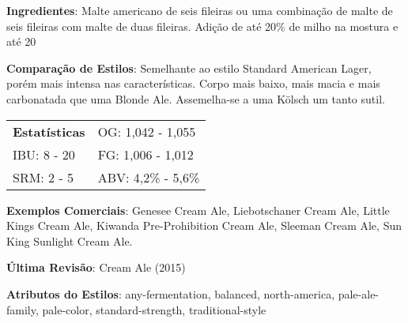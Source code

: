\textbf{Ingredientes}: Malte americano de seis fileiras ou uma combinação de malte de seis fileiras com malte de duas fileiras. Adição de até 20\% de milho na mostura e até 20%

\textbf{Comparação de Estilos}: Semelhante ao estilo Standard American Lager, porém mais intensa nas características. Corpo mais baixo, mais macia e mais carbonatada que uma Blonde Ale. Assemelha-se a uma Kölsch um tanto sutil.

\begin{tabular}{@{}p{35mm}p{35mm}@{}}
  \textbf{Estatísticas} & OG: 1,042 - 1,055 \\
  IBU: 8 - 20  & FG: 1,006 - 1,012 \\
  SRM: 2 - 5  & ABV: 4,2\% - 5,6\%
\end{tabular}

\textbf{Exemplos Comerciais}: Genesee Cream Ale, Liebotschaner Cream Ale, Little Kings Cream Ale, Kiwanda Pre-Prohibition Cream Ale, Sleeman Cream Ale, Sun King Sunlight Cream Ale.

\textbf{Última Revisão}: Cream Ale (2015)

\textbf{Atributos do Estilos}: any-fermentation, balanced, north-america, pale-ale-family, pale-color, standard-strength, traditional-style
